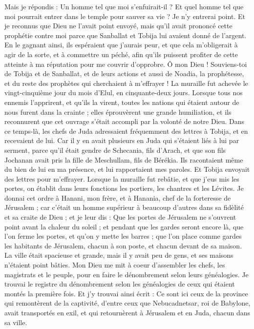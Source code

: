 \begin{multicols}{2}
Mais je répondis : Un homme tel que moi s'enfuirait-il ? Et quel homme tel que moi pourrait entrer dans le temple pour sauver sa vie ? Je n'y entrerai point.
Et je reconnus que Dieu ne l'avait point envoyé, mais qu'il avait prononcé cette prophétie contre moi parce que Sanballat et Tobija lui avaient donné de l'argent.
En le gagnant ainsi, ils espéraient que j'aurais peur, et que cela m’obligerait à agir de la sorte, et à commettre un péché, afin qu'ils puissent profiter de cette atteinte à ma réputation pour me couvrir d'opprobre.
Ô mon Dieu ! Souviens-toi de Tobija et de Sanballat, et de leurs actions et aussi de Noadia, la prophétesse, et du reste des prophètes qui cherchaient à m'effrayer !
La muraille fut achevée le vingt-cinquième jour du mois d'Elul, en cinquante-deux jours.
Lorsque tous nos ennemis l'apprirent, et qu’ils la virent, toutes les nations qui étaient autour de nous furent dans la crainte ; elles éprouvèrent une grande humiliation, et ils reconnurent que cet ouvrage s'était accompli par la volonté de notre Dieu.
Dans ce temps-là, les chefs de Juda adressaient fréquemment des lettres à Tobija, et en recevaient de lui.
Car il y en avait plusieurs en Juda qui s'étaient liés à lui par serment, parce qu'il était gendre de Schecania, fils d'Arach, et que son fils Jochanan avait pris la fille de Meschullam, fils de Bérékia.
Ils racontaient même du bien de lui en ma présence, et lui rapportaient mes paroles. Et Tobija envoyait des lettres pour m'effrayer.
\VerseOne{}Lorsque la muraille fut rebâtie, et que j'eus mis les portes, on établit dans leurs fonctions les portiers, les chantres et les Lévites.
Je donnai cet ordre à Hanani, mon frère, et à Hanania, chef de la forteresse de Jérusalem ; car c'était un homme supérieur à beaucoup d'autres dans sa fidèlité et sa craite de Dieu ;
et je leur dis : Que les portes de Jérusalem ne s'ouvrent point avant la chaleur du soleil ; et pendant que les gardes seront encore là, que l'on ferme les portes, et qu'on y mette les barres ; que l'on place comme gardes les habitants de Jérusalem, chacun à son poste, et chacun devant de sa maison.
La ville était spacieuse et grande, mais il y avait peu de gens, et ses maisons n'étaient point bâties.
Mon Dieu me mit à coeur d'assembler les chefs, les magistrats et le peuple, pour en faire le dénombrement selon leurs généalogies. Je trouvai le registre du dénombrement selon les généalogies de ceux qui étaient montés la première fois. Et j'y trouvai ainsi écrit :
Ce sont ici ceux de la province qui remontèrent de la captivité, d'entre ceux que Nebucadnetsar, roi de Babylone, avait transportés en exil, et qui retournèrent à Jérusalem et en Juda, chacun dans sa ville.

\end{multicols}
